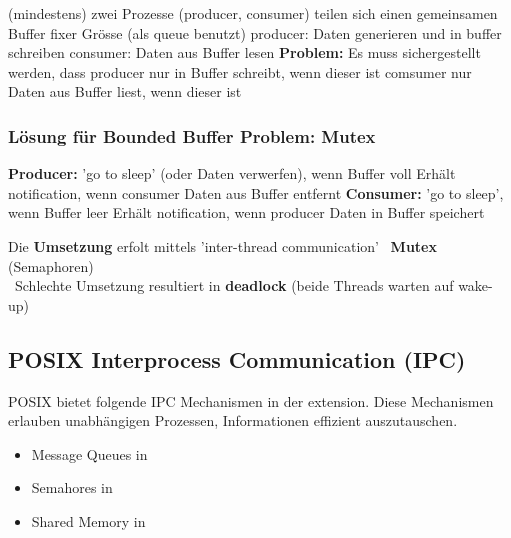 \vspace{0.1cm}

\begin{outline}
    \1 (mindestens) zwei Prozesse (producer, consumer) teilen sich einen gemeinsamen Buffer fixer Grösse (als queue benutzt)
        \2 producer: Daten generieren und in buffer schreiben
        \2 consumer: Daten aus Buffer lesen
    \1 \textbf{Problem:} Es muss sichergestellt werden, dass
        \2 producer nur in Buffer schreibt, wenn dieser  ist
        \2 comsumer nur Daten aus Buffer liest, wenn dieser  ist
\end{outline}


\subsubsection{Lösung für Bounded Buffer Problem: Mutex}

\begin{outline}
    \1 \textbf{Producer:} 'go to sleep' (oder Daten verwerfen), wenn Buffer voll
        \2 Erhält notification, wenn consumer Daten aus Buffer entfernt
    \1 \textbf{Consumer:} 'go to sleep', wenn Buffer leer
        \2 Erhält notification, wenn producer Daten in Buffer speichert
\end{outline}

\vspace{0.1cm}

Die \textbf{Umsetzung} erfolt mittels 'inter-thread communication' \textrightarrow\ \textbf{Mutex} (Semaphoren) \\
\textrightarrow\ Schlechte Umsetzung resultiert in \textbf{deadlock} (beide Threads warten auf wake-up)


\subsection{POSIX Interprocess Communication (IPC)}

POSIX bietet folgende IPC Mechanismen in der  extension.
Diese Mechanismen erlauben unabhängigen Prozessen, Informationen effizient auszutauschen.

\vspace{0.1cm}

\begin{minipage}[t]{0.48\columnwidth}
    \raggedright
    \begin{itemize}
        \item Message Queues in 
        \item Semahores in 
    \end{itemize}
\end{minipage}
\hfill
\begin{minipage}[t]{0.48\columnwidth}
    \raggedright
    \begin{itemize}
        \item Shared Memory in 
    \end{itemize}
\end{minipage}

